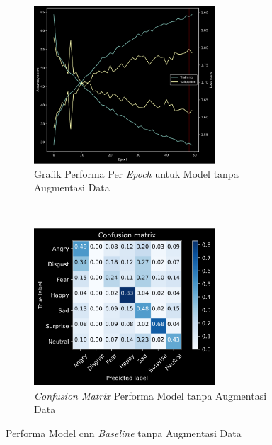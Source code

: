 \begin{figure}[t]
    \centering
    \begin{subfigure}[t]{6.75cm}
        \includegraphics[width=6.75cm]{gambar/eksperimen1_grafik1.png}
        \caption{Grafik Performa Per \textit{Epoch} untuk Model tanpa Augmentasi Data}
        \label{fig:grafikeksperimen1}
    \end{subfigure}
    ~~~
    \begin{subfigure}[t]{6.75cm}
        \includegraphics[width=6.75cm]{gambar/eksperimen1_matriks1.png}
        \caption{\textit{Confusion Matrix} Performa Model tanpa Augmentasi Data}
        \label{fig:confusionmatrixeksperimen1}
    \end{subfigure}
    \caption{Performa Model \acrshort{cnn} \textit{Baseline} tanpa Augmentasi Data}
    \label{fig:hasileksperimen1}
\end{figure}
